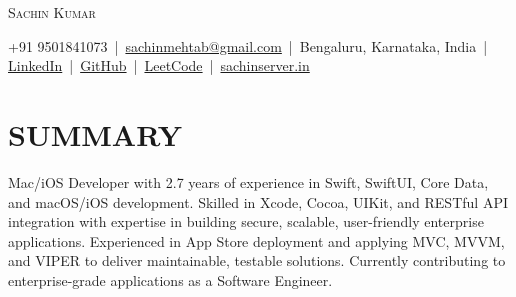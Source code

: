 \documentclass[letterpaper,11pt]{article}
\begin{document}
\begin{center}
{\Huge \scshape Sachin Kumar} \\ \vspace{6pt}

\small 
+91 9501841073 \,|\, 
\href{mailto:sachinmehtab@gmail.com}{sachinmehtab@gmail.com} \,|\, 
Bengaluru, Karnataka, India \,|\, 
\href{https://linkedin.com/in/sachinkumar6174}{LinkedIn} \,|\, 
\href{https://github.com/sachin6174}{GitHub} \,|\, 
\href{https://leetcode.com/u/sachinkumar6174/}{LeetCode} \,|\, 
\href{https://www.sachinserver.in}{sachinserver.in}
\end{center}

\vspace{-2pt}

\section{SUMMARY}
Mac/iOS Developer with 2.7 years of experience in Swift, SwiftUI, Core Data, and macOS/iOS development. Skilled in Xcode, Cocoa, UIKit, and RESTful API integration with expertise in building secure, scalable, user-friendly enterprise applications. Experienced in App Store deployment and applying MVC, MVVM, and VIPER to deliver maintainable, testable solutions. Currently contributing to enterprise-grade applications as a Software Engineer.

\end{document}
